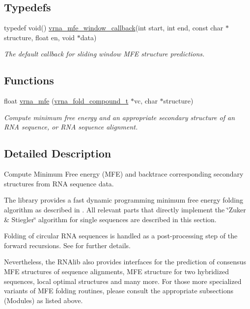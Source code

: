 \subsection*{Typedefs}
\begin{DoxyCompactItemize}
\item 
typedef void() \hyperlink{group__mfe__fold_ga4f3e5bc214ef803074ace313cb9571b4}{vrna\+\_\+mfe\+\_\+window\+\_\+callback}(int start, int end, const char $\ast$structure, float en, void $\ast$data)
\begin{DoxyCompactList}\small\item\em The default callback for sliding window M\+FE structure predictions. \end{DoxyCompactList}\end{DoxyCompactItemize}
\subsection*{Functions}
\begin{DoxyCompactItemize}
\item 
float \hyperlink{group__mfe__fold_gabd3b147371ccf25c577f88bbbaf159fd}{vrna\+\_\+mfe} (\hyperlink{group__fold__compound_ga1b0cef17fd40466cef5968eaeeff6166}{vrna\+\_\+fold\+\_\+compound\+\_\+t} $\ast$vc, char $\ast$structure)
\begin{DoxyCompactList}\small\item\em Compute minimum free energy and an appropriate secondary structure of an R\+NA sequence, or R\+NA sequence alignment. \end{DoxyCompactList}\end{DoxyCompactItemize}


\subsection{Detailed Description}
Compute Minimum Free energy (M\+FE) and backtrace corresponding secondary structures from R\+NA sequence data. 

The library provides a fast dynamic programming minimum free energy folding algorithm as described in \cite{zuker:1981}. All relevant parts that directly implement the \char`\"{}\+Zuker \& Stiegler\char`\"{} algorithm for single sequences are described in this section.

Folding of circular R\+NA sequences is handled as a post-\/processing step of the forward recursions. See \cite{hofacker:2006} for further details.

Nevertheless, the R\+N\+Alib also provides interfaces for the prediction of consensus M\+FE structures of sequence alignments, M\+FE structure for two hybridized sequences, local optimal structures and many more. For those more specialized variants of M\+FE folding routines, please consult the appropriate subsections (Modules) as listed above. 

